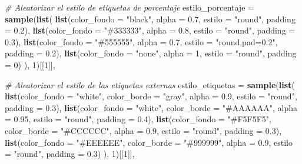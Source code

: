 \documentclass[
]{article}
\newenvironment{Shaded}{\begin{snugshade}}{\end{snugshade}}
\newcommand{\AttributeTok}[1]{\textcolor[rgb]{0.13,0.29,0.53}{#1}}
\newcommand{\CommentTok}[1]{\textcolor[rgb]{0.56,0.35,0.01}{\textit{#1}}}
\newcommand{\DecValTok}[1]{\textcolor[rgb]{0.00,0.00,0.81}{#1}}
\newcommand{\FloatTok}[1]{\textcolor[rgb]{0.00,0.00,0.81}{#1}}
\newcommand{\FunctionTok}[1]{\textcolor[rgb]{0.13,0.29,0.53}{\textbf{#1}}}
\newcommand{\NormalTok}[1]{#1}
\newcommand{\StringTok}[1]{\textcolor[rgb]{0.31,0.60,0.02}{#1}}
\begin{document}
\begin{Shaded}
\begin{Highlighting}[]
  \CommentTok{\# Aleatorizar el estilo de etiquetas de porcentaje}
  \AttributeTok{estilo\_porcentaje =} \FunctionTok{sample}\NormalTok{(}\FunctionTok{list}\NormalTok{(}
    \FunctionTok{list}\NormalTok{(}\AttributeTok{color\_fondo =} \StringTok{"black"}\NormalTok{, }\AttributeTok{alpha =} \FloatTok{0.7}\NormalTok{, }\AttributeTok{estilo =} \StringTok{"round"}\NormalTok{, }\AttributeTok{padding =} \FloatTok{0.2}\NormalTok{),}
    \FunctionTok{list}\NormalTok{(}\AttributeTok{color\_fondo =} \StringTok{"\#333333"}\NormalTok{, }\AttributeTok{alpha =} \FloatTok{0.8}\NormalTok{, }\AttributeTok{estilo =} \StringTok{"round"}\NormalTok{, }\AttributeTok{padding =} \FloatTok{0.3}\NormalTok{),}
    \FunctionTok{list}\NormalTok{(}\AttributeTok{color\_fondo =} \StringTok{"\#555555"}\NormalTok{, }\AttributeTok{alpha =} \FloatTok{0.7}\NormalTok{, }\AttributeTok{estilo =} \StringTok{"round,pad=0.2"}\NormalTok{, }\AttributeTok{padding =} \FloatTok{0.2}\NormalTok{),}
    \FunctionTok{list}\NormalTok{(}\AttributeTok{color\_fondo =} \StringTok{"none"}\NormalTok{, }\AttributeTok{alpha =} \DecValTok{1}\NormalTok{, }\AttributeTok{estilo =} \StringTok{"round"}\NormalTok{, }\AttributeTok{padding =} \DecValTok{0}\NormalTok{)}
\NormalTok{  ), }\DecValTok{1}\NormalTok{)[[}\DecValTok{1}\NormalTok{]],}

  \CommentTok{\# Aleatorizar el estilo de las etiquetas externas}
  \AttributeTok{estilo\_etiquetas =} \FunctionTok{sample}\NormalTok{(}\FunctionTok{list}\NormalTok{(}
    \FunctionTok{list}\NormalTok{(}\AttributeTok{color\_fondo =} \StringTok{"white"}\NormalTok{, }\AttributeTok{color\_borde =} \StringTok{"gray"}\NormalTok{, }\AttributeTok{alpha =} \FloatTok{0.9}\NormalTok{, }\AttributeTok{estilo =} \StringTok{"round"}\NormalTok{, }\AttributeTok{padding =} \FloatTok{0.3}\NormalTok{),}
    \FunctionTok{list}\NormalTok{(}\AttributeTok{color\_fondo =} \StringTok{"white"}\NormalTok{, }\AttributeTok{color\_borde =} \StringTok{"\#AAAAAA"}\NormalTok{, }\AttributeTok{alpha =} \FloatTok{0.95}\NormalTok{, }\AttributeTok{estilo =} \StringTok{"round"}\NormalTok{, }\AttributeTok{padding =} \FloatTok{0.4}\NormalTok{),}
    \FunctionTok{list}\NormalTok{(}\AttributeTok{color\_fondo =} \StringTok{"\#F5F5F5"}\NormalTok{, }\AttributeTok{color\_borde =} \StringTok{"\#CCCCCC"}\NormalTok{, }\AttributeTok{alpha =} \FloatTok{0.9}\NormalTok{, }\AttributeTok{estilo =} \StringTok{"round"}\NormalTok{, }\AttributeTok{padding =} \FloatTok{0.3}\NormalTok{),}
    \FunctionTok{list}\NormalTok{(}\AttributeTok{color\_fondo =} \StringTok{"\#EEEEEE"}\NormalTok{, }\AttributeTok{color\_borde =} \StringTok{"\#999999"}\NormalTok{, }\AttributeTok{alpha =} \FloatTok{0.9}\NormalTok{, }\AttributeTok{estilo =} \StringTok{"round"}\NormalTok{, }\AttributeTok{padding =} \FloatTok{0.3}\NormalTok{)}
\NormalTok{  ), }\DecValTok{1}\NormalTok{)[[}\DecValTok{1}\NormalTok{]],}


\end{Highlighting}
\end{Shaded}
\end{document}
